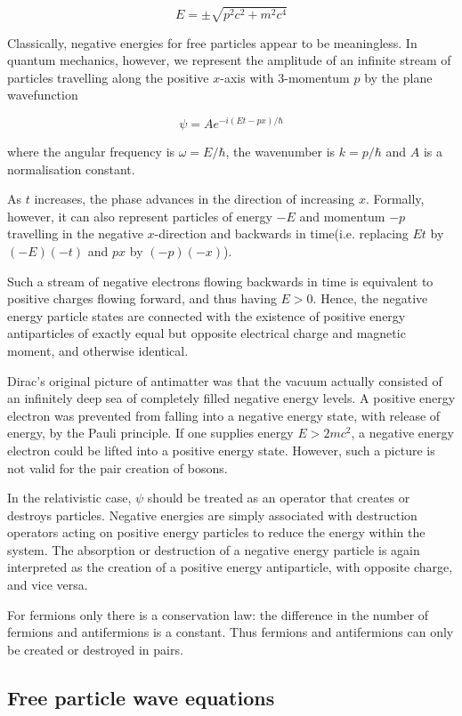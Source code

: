 \documentclass[en, device=normal]{elegantnote}
\begin{document}
$$E=\pm\sqrt{p^2c^2+m^2c^4}$$

Classically, negative energies for free particles appear to be meaningless. In quantum 
mechanics, however, we represent the amplitude of an infinite stream of particles travelling 
along the positive $x$-axis with 3-momentum $p$ by the plane wavefunction 

$$\psi=Ae^{-i(Et-px)/\hbar}$$

where the angular frequency is $\omega=E/\hbar$, the wavenumber is $k=p/\hbar$ and $A$ 
is a normalisation constant.

As $t$ increases, the phase advances in the direction of increasing $x$. Formally, however, 
it can also represent particles of energy $-E$ and momentum $-p$ travelling in the negative $x$-direction 
and backwards in time(i.e. replacing $Et$ by $(-E)(-t)$ and $px$ by $(-p)(-x)$).

Such a stream of negative electrons flowing backwards in time is equivalent to positive charges 
flowing forward, and thus having $E>0$. Hence, the negative energy particle states are connected 
with the existence of positive energy antiparticles of exactly equal but opposite electrical 
charge and magnetic moment, and otherwise identical.

Dirac's original picture of antimatter was that the vacuum actually consisted of an 
infinitely deep sea of completely filled negative energy levels. A positive energy electron 
was prevented from falling into a negative energy state, with release of energy, by the Pauli principle. 
If one supplies energy $E>2mc^2$, a negative energy electron could be lifted into a positive 
energy state. However, such a picture is not valid for the pair creation of bosons.

In the relativistic case, $\psi$ should be treated as an operator that creates or destroys 
particles. Negative energies are simply associated with destruction operators acting on positive 
energy particles to reduce the energy within the system. The absorption or destruction of a 
negative energy particle is again interpreted as the creation of a positive energy antiparticle, 
with opposite charge, and vice versa.

For fermions only there is a conservation law: the difference in the number of fermions 
and antifermions is a constant. Thus fermions and antifermions can only be created or 
destroyed in pairs.

\subsection{Free particle wave equations}
\end{document}
